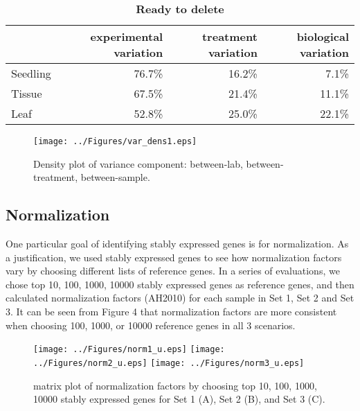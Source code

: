 \documentclass[11pt, a4paper]{article}
\begin{document}
\begin{center}
\begin{table}[h]
\begin{tabular}{lrrr} \hline
&experimental variation & treatment variation & biological variation  \\  \hline
Seedling  &76.7\% &16.2\% &7.1\%  \\
   Tissue  &67.5\% &21.4\% &11.1\%  \\
     Leaf   &52.8\% &25.0\% &22.1\% \\ \hline
\end{tabular}
\caption{\textbf{Ready to delete}}
\label{table:percentageofvariation}
\end{table}
\end{center} 
 
 \begin{figure}[h]
\begin{center}
\texttt{[image: ../Figures/var\_dens1.eps]}
\caption{\label{densityplot} Density plot of variance component: between-lab, between-treatment, between-sample.}
\end{center}
\end{figure} 



\subsection{Normalization}
One particular goal of identifying stably expressed genes is for normalization. As a justification, we used stably expressed genes to see how normalization factors vary by choosing different lists of reference genes.   In a series of evaluations, we chose top 10, 100, 1000, 10000 stably expressed genes as reference genes, and then calculated normalization factors \citep{anders2010differential}(AH2010) for each sample in Set 1, Set 2 and Set 3. It can be seen from Figure 4 that normalization factors are more consistent when choosing 100, 1000, or 10000 reference genes in all 3 scenarios. 

 \begin{figure}[h!]
\begin{center}
\texttt{[image: ../Figures/norm1\_u.eps]}
\texttt{[image: ../Figures/norm2\_u.eps]}
\texttt{[image: ../Figures/norm3\_u.eps]}
\caption{\label{fig:scaled_diss} matrix plot of normalization factors by choosing top 10, 100, 1000, 10000 stably expressed genes for Set 1 (A), Set 2 (B), and Set 3 (C). }
\end{center}
\end{figure}
\end{document}
